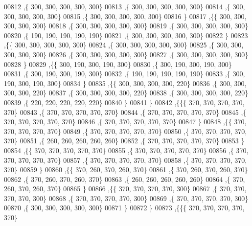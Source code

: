 \begin{DoxyCode}
00812    ,\{   300,   300,   300,   300,   300\}
00813    ,\{   300,   300,   300,   300,   300\}
00814    ,\{   300,   300,   300,   300,   300\}
00815    ,\{   300,   300,   300,   300,   300\}
00816    \}
00817   ,\{\{   300,   300,   300,   300,   300\}
00818    ,\{   300,   300,   300,   300,   300\}
00819    ,\{   300,   300,   300,   300,   300\}
00820    ,\{   190,   190,   190,   190,   190\}
00821    ,\{   300,   300,   300,   300,   300\}
00822    \}
00823   ,\{\{   300,   300,   300,   300,   300\}
00824    ,\{   300,   300,   300,   300,   300\}
00825    ,\{   300,   300,   300,   300,   300\}
00826    ,\{   300,   300,   300,   300,   300\}
00827    ,\{   300,   300,   300,   300,   300\}
00828    \}
00829   ,\{\{   300,   190,   300,   190,   300\}
00830    ,\{   300,   190,   300,   190,   300\}
00831    ,\{   300,   190,   300,   190,   300\}
00832    ,\{   190,   190,   190,   190,   190\}
00833    ,\{   300,   190,   300,   190,   300\}
00834    \}
00835   ,\{\{   300,   300,   300,   300,   220\}
00836    ,\{   300,   300,   300,   300,   220\}
00837    ,\{   300,   300,   300,   300,   220\}
00838    ,\{   300,   300,   300,   300,   220\}
00839    ,\{   220,   220,   220,   220,   220\}
00840    \}
00841   \}
00842  ,\{\{\{   370,   370,   370,   370,   370\}
00843    ,\{   370,   370,   370,   370,   370\}
00844    ,\{   370,   370,   370,   370,   370\}
00845    ,\{   370,   370,   370,   370,   370\}
00846    ,\{   370,   370,   370,   370,   370\}
00847    \}
00848   ,\{\{   370,   370,   370,   370,   370\}
00849    ,\{   370,   370,   370,   370,   370\}
00850    ,\{   370,   370,   370,   370,   370\}
00851    ,\{   260,   260,   260,   260,   260\}
00852    ,\{   370,   370,   370,   370,   370\}
00853    \}
00854   ,\{\{   370,   370,   370,   370,   370\}
00855    ,\{   370,   370,   370,   370,   370\}
00856    ,\{   370,   370,   370,   370,   370\}
00857    ,\{   370,   370,   370,   370,   370\}
00858    ,\{   370,   370,   370,   370,   370\}
00859    \}
00860   ,\{\{   370,   260,   370,   260,   370\}
00861    ,\{   370,   260,   370,   260,   370\}
00862    ,\{   370,   260,   370,   260,   370\}
00863    ,\{   260,   260,   260,   260,   260\}
00864    ,\{   370,   260,   370,   260,   370\}
00865    \}
00866   ,\{\{   370,   370,   370,   370,   300\}
00867    ,\{   370,   370,   370,   370,   300\}
00868    ,\{   370,   370,   370,   370,   300\}
00869    ,\{   370,   370,   370,   370,   300\}
00870    ,\{   300,   300,   300,   300,   300\}
00871    \}
00872   \}
00873  ,\{\{\{   370,   370,   370,   370,   370\}

\end{DoxyCode}
